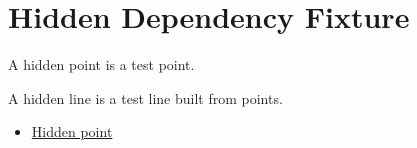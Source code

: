\section{Hidden Dependency Fixture}

\begin{definition}
\label{def:hidden-point}
A hidden point is a test point.
\end{definition}

\begin{lra-not-visible}
\NoLocalDependencies
\end{lra-not-visible}

\begin{definition}
\label{def:hidden-line}
A hidden line is a test line built from points.
\end{definition}

\begin{lra-not-visible}
\begin{dependencies}
\begin{itemize}
  \item \hyperref[def:hidden-point]{Hidden point}
\end{itemize}
\end{dependencies}
\end{lra-not-visible}

